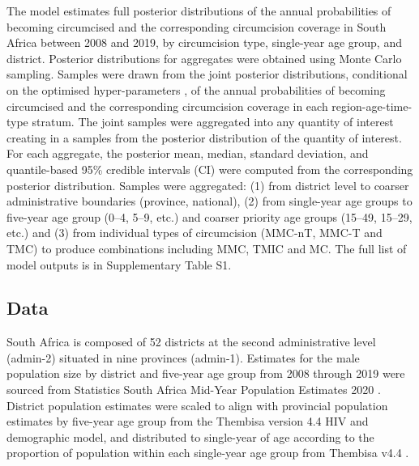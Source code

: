 \documentclass{article}
\begin{document}
The model estimates full posterior distributions of the annual probabilities of becoming circumcised and the corresponding circumcision coverage in South Africa between 2008 and 2019, by circumcision type, single-year age group, and district. Posterior distributions for aggregates were obtained using Monte Carlo sampling. Samples were drawn from the joint posterior distributions, conditional on the optimised hyper-parameters \autocite{eaton2021naomi}, of the annual probabilities of becoming circumcised and the corresponding circumcision coverage in each region-age-time-type stratum. The joint samples were aggregated into any quantity of interest creating in a samples from the posterior distribution of the quantity of interest. For each aggregate, the posterior mean, median, standard deviation, and quantile-based 95\% credible intervals (CI) were computed from the corresponding posterior distribution. Samples were aggregated: (1) from district level to coarser administrative boundaries (province, national), (2) from single-year age groups to five-year age group (0--4, 5--9, etc.) and coarser priority age groups (15--49, 15--29, etc.) and (3) from individual types of circumcision (MMC-nT, MMC-T and TMC) to produce combinations including MMC, TMIC and MC. The full list of model outputs is in Supplementary Table S1. 


\subsection*{Data}


South Africa is composed of 52 districts at the second administrative level (admin-2) situated in nine provinces (admin-1). Estimates for the male population size by district and five-year age group from 2008 through 2019 were sourced from Statistics South Africa Mid-Year Population Estimates 2020 \autocite{StatsSAPop}. District population estimates were scaled to align with provincial population estimates by five-year age group from the Thembisa version 4.4 HIV and demographic model, and distributed to single-year of age according to the proportion of population within each single-year age group from Thembisa v4.4 \autocite{johnson2021thembisa}.
\end{document}
